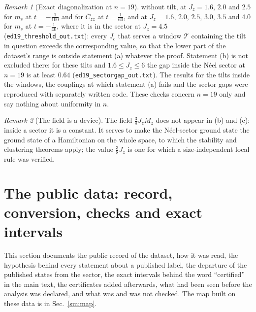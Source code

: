\documentclass[aps,prx,onecolumn,10pt,nofootinbib,longbibliography,floatfix]{revtex4-2}
\theoremstyle{remark}
\newtheorem*{remark}{Remark}
\newcommand{\Jz}{J_z}
\newcommand{\ms}{m_s}
\newcommand{\Czz}{\bar C_{zz}}
\begin{document}
\begin{remark}[Exact diagonalization at $n=19$]
without tilt, at $\Jz=1.6$, $2.0$ and $2.5$ for $\ms$ at $t=-\frac1{100}$ and for $\Czz$ at $t=\frac1{60}$, and %
at $\Jz=1.6$, $2.0$, $2.5$, $3.0$, $3.5$ and $4.0$ for $\ms$ at $t=-\frac1{40}$, where it is in the sector at %
$\Jz=4.5$ (\texttt{ed19\_threshold\_out.txt}): every $J_c$ that serves a window $\mathcal T$ containing the tilt in
question exceeds the corresponding value, so that the lower part of the dataset's
range is outside statement (a) whatever the proof. Statement (b) is not excluded there: for these tilts and
$1.6\le \Jz\le6$ the gap inside the N\'eel sector at $n=19$ is at least $0.64$ (\texttt{ed19\_sectorgap\_out.txt}). %
The results for the tilts inside the windows, the couplings at which statement (a) fails and the sector gaps were
reproduced with separately written code.
These checks concern $n=19$ only %
and say nothing about uniformity in $n$.
\end{remark}

\begin{remark}[The field is a device]
The field $\frac38\Jz M_z$ does not appear in (b) and (c): inside a sector it is a constant. It serves to make the
N\'eel-sector ground state the ground state of a Hamiltonian on the whole space, to which the stability and
clustering theorems apply; the value $\frac38\Jz$ is one for which a size-independent local rule was verified.
\end{remark}
\section{The public data: record, conversion, checks and exact intervals}
\label{sm:public}

This section documents the public record of the dataset, how it was read, the hypothesis behind every statement about
a published label, the departure of the published states from the sector, the exact intervals behind the word
``certified'' in the main text, the certificates added afterwards, what had been seen before the analysis was
declared, and what was and was not checked. The map built on these data is in Sec.~\ref{sm:map}.
\end{document}
